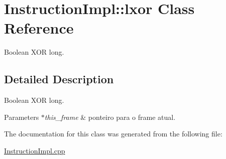 \hypertarget{class_instruction_impl_1_1lxor}{}\section{Instruction\+Impl\+:\+:lxor Class Reference}
\label{class_instruction_impl_1_1lxor}


Boolean X\+OR long.  




\subsection{Detailed Description}
Boolean X\+OR long. 


\begin{DoxyParams}{Parameters}
{\em $\ast$this\+\_\+frame} & ponteiro para o frame atual.  \\
\hline
\end{DoxyParams}


The documentation for this class was generated from the following file\+:\begin{DoxyCompactItemize}
\item 
\hyperlink{_instruction_impl_8cpp}{Instruction\+Impl.\+cpp}\end{DoxyCompactItemize}
